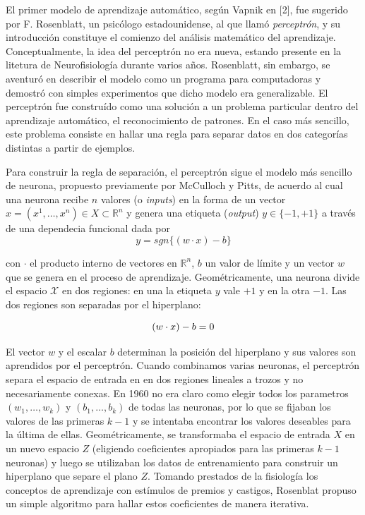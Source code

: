 \documentclass{report}
\begin{document}
El primer modelo de aprendizaje automático, según Vapnik en [2], fue sugerido por F. Rosenblatt, un psicólogo estadounidense, al que llamó \textit{perceptrón}, y su introducción
constituye el comienzo del análisis matemático del aprendizaje. Conceptualmente, la idea del perceptrón no era nueva, estando presente en la litetura de Neurofisiología durante
varios años. Rosenblatt, sin embargo, se aventuró en describir el modelo como un programa para computadoras y demostró con simples experimentos que dicho modelo era generalizable.
El perceptrón fue construído como una solución a un problema particular dentro del aprendizaje automático, el reconocimiento de patrones. En el caso más sencillo, este problema
consiste en hallar una regla para separar datos en dos categorías distintas a partir de ejemplos.\newline

Para construir la regla de separación, el perceptrón sigue el modelo más sencillo de neurona, propuesto previamente por McCulloch y Pitts, de acuerdo al cual una neurona recibe
\(n\) valores (o \textit{inputs}) en la forma de un vector \(x = (x^1,\dots, x^n) \in X \subset \mathbb{R}^n \) y genera una etiqueta (\textit{output}) 
\(y\in\{-1,+1\}\) a través de una dependecia funcional dada por
\[
y = sgn\{(w\cdot x)-b\}
\]

con \(\cdot\) el producto interno de vectores en \(\mathbb{R}^n\), \(b\) un valor de límite y un vector \(w\) que se genera en el proceso de aprendizaje. Geométricamente, una 
neurona divide el espacio \(\mathcal{X}\) en dos regiones: en una la etiqueta \(y\) vale \(+1\) y en la otra \(-1\). Las dos regiones son separadas por el hiperplano:\newline

\[
(w\cdot x) - b = 0 \newline
\]

El vector \(w\) y el escalar \(b\) determinan la posición del hiperplano y sus valores son aprendidos por el perceptrón. Cuando combinamos varias neuronas, el perceptrón
separa el espacio de entrada en en dos regiones lineales a trozos y no necesariamente conexas. En 1960 no era claro como elegir todos los parametros \((w_1,\dots,w_k)\) y
\((b_1,\dots, b_k)\) de todas las neuronas, por lo que se fijaban los valores de las primeras \(k-1\) y se intentaba encontrar los valores deseables para la última
de ellas. Geométricamente, se transformaba el espacio de entrada $X$ en un nuevo espacio $Z$ (eligiendo coeficientes apropiados para las primeras $k-1$ neuronas) y luego
se utilizaban los datos de entrenamiento para construir un hiperplano que separe el plano $Z$. Tomando prestados de la fisiología los conceptos de aprendizaje con estímulos de premios y castigos, Rosenblat propuso un simple algoritmo para hallar estos 
coeficientes de manera iterativa.\newline
\end{document}
